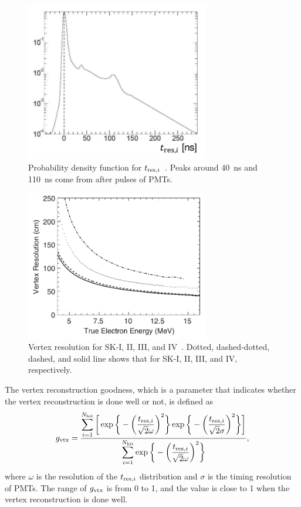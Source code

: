 \begin{figure}[h]
	\centering
	\includegraphics[width=8cm]{Figures/Reconstruction/PDF_vertex}
	\caption[Probability density function for $t_{{\rm res},i}$]{
	Probability density function for $t_{{\rm res},i}$~\cite{2023HaradaPhD}.
	Peaks around 40~ns and 110~ns come from after pulses of PMTs.
	}\label{Recons_PDF_vertex}
\end{figure}

\begin{figure}[tbp]
	\centering
	\includegraphics[width=8cm]{Figures/Reconstruction/Res_vertex}
	\caption[Vertex resolution for SK-I, II, III, and IV]{
	Vertex resolution for SK-I, II, III, and IV~\cite{2016Abe}.
	Dotted, dashed-dotted, dashed, and solid line shows that for SK-I, II, III, and IV, respectively.
	}\label{Recons_Res_vertex}
\end{figure}

\hs
The vertex reconstruction goodness, which is a parameter that indicates whether the vertex reconstruction is done well or not, is defined as
\begin{eqnarray}
	g_{\rm vtx} = {\displaystyle \sum_{i=1}^{N_{\rm hit}} \bigg[\exp\bigg\{-\bigg({t_{{\rm res},i} \over \sqrt{2}\omega}\bigg)^{2}\bigg\}\exp\bigg\{-\bigg({t_{{\rm res},i} \over \sqrt{2}\sigma}\bigg)^{2}\bigg\}\bigg] \over \displaystyle \sum_{i=1}^{N_{\rm hit}} \exp\bigg\{-\bigg({t_{{\rm res},i} \over \sqrt{2}\omega}\bigg)^{2}\bigg\}},
\end{eqnarray}
where $\omega$ is the resolution of the $t_{{\rm res},i}$ distribution and $\sigma$ is the timing resolution of PMTs.
The range of $g_{\rm vtx}$ is from 0 to 1, and the value is close to 1 when the vertex reconstruction is done well.





